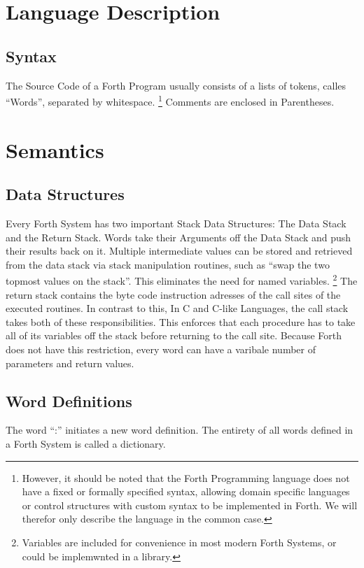 \documentclass{llncs}
\begin{document}
\section{Language Description}
\subsection{Syntax}
The Source Code of a Forth Program usually consists of a lists of tokens, calles ``Words'', separated by whitespace. 
\footnote{However, it should be noted that the Forth Programming language does not have a fixed or formally specified syntax, allowing domain specific languages or control structures with custom syntax to be implemented in Forth. We will therefor only describe the language in the common case.} Comments are enclosed in Parentheses.

\section{Semantics}

\subsection{Data Structures}
Every Forth System has two important Stack Data Structures: The Data Stack and the Return Stack. Words take their Arguments off the Data Stack and push their results back on it.
Multiple intermediate values can be stored and retrieved from the data stack via stack manipulation routines, such as ``swap the two topmost values on the stack''. This eliminates the need for named variables.
\footnote{Variables are included for convenience in most modern Forth Systems, or could be implemwnted in a library.}
The return stack contains the byte code instruction adresses of the call sites of the executed routines.
In contrast to this, In C and C-like Languages, the call stack takes both of these responsibilities. This enforces that each procedure has to take all of its variables off the stack before returning to the call site.
Because Forth does not have this restriction, every word can have a varibale number of parameters and return values.

\subsection{Word Definitions}

The word ``:'' initiates a new word definition. 
The entirety of all words defined in a Forth System is called a dictionary.
\end{document}
